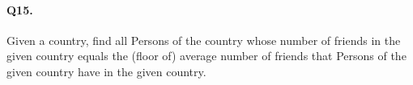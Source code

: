 \paragraph{Q15.}

Given a country, find all Persons of the country whose number of friends
in the given country equals the (floor of) average number of friends
that Persons of the given country have in the given country.

